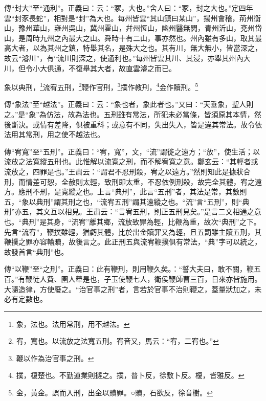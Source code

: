 {\noindent\zhuan{}\fzbyks 傳“封大”至“通利”。正義曰：云：“冢，大也。”舍人曰：“冢，封之大也。”定四年雲“封豕長蛇”，相對是“封”為大也。每州皆雲“其山鎮曰某山”，揚州會稽，荊州衡山，豫州華山，雍州吳山，冀州霍山，幷州恆山，幽州醫無閭，青州沂山，兗州岱山，是周時九州之內最大之山。舜時十有二山，事亦然也。州內雖有多山，取其最高大者，以為其州之鎮，特舉其名，是殊大之也。其有川，無大無小，皆當深之，故云“濬川”，有“流川則深之，使通利也。”每州皆雲其川、其浸，亦舉其州內大川，但令小大俱通，不復舉其大者，故直雲濬之而已。 \par}

象以典刑，\footnote{象，法也。法用常刑，用不越法。}流宥五刑，\footnote{宥，寬也。以流放之法寬五刑。宥音又，馬云：“宥，二宥也。”}鞭作官刑，\footnote{鞭以作為治官事之刑。}撲作教刑，\footnote{撲，榎楚也。不勤道業則撻之。撲，普卜反，徐敷卜反。榎，皆雅反。}金作贖刑。\footnote{金，黃金。誤而入刑，出金以贖罪。○贖，石欲反，徐音樹。}

{\noindent\zhuan{}\fzbyks 傳“象法”至“越法”。正義曰：云：“象也者，象此者也。”又曰：“天垂象，聖人則之。”是“象”為仿法，故為法也。五刑雖有常法，所犯未必當條，皆須原其本情，然後斷決。或情有差降，俱被重科；或意有不同，失出失入，皆是違其常法。故令依法用其常刑，用之使不越法也。 \par}

{\noindent\zhuan{}\fzbyks 傳“宥寬”至“五刑”。正義曰：“宥，寬”，文，“流”謂徙之遠方；“放”，使生活；以流放之法寬縱五刑也。此惟解以流寬之刑，而不解宥寬之意。鄭玄云：“其輕者或流放之，四罪是也。”王肅云：“謂君不忍刑殺，宥之以遠方。”然則知此是據狀合刑，而情差可恕，全赦則太輕，致刑即太重，不忍依例刑殺，故完全其體，宥之遠方。應刑不刑，是寬縱之也。上言“典刑”，此言“五刑”者，其法是常，其數則五，“象以典刑”謂其刑之也，“流宥五刑”謂其遠縱之也。“流”言“五刑”，則“典刑”亦五，其文互以相見。王肅云：“言宥五刑，則正五刑見矣。”是言二文相通之意也。“典刑”是其身，“流宥”離其鄉，流放致罪為輕，比鞭為重，故次“典刑”之下。先言“流宥”，鞭撲雖輕，猶虧其體，比於出金贖罪又為輕，且五罰雖主贖五刑，其鞭撲之罪亦容輸贖，故後言之。此正刑五與流宥鞭撲俱有常法，“典”字可以統之，故發首言“典刑”也。 \par}

{\noindent\zhuan{}\fzbyks 傳“以鞭”至“之刑”。正義曰：此有鞭刑，則用鞭久矣。：“誓大夫曰，敢不關，鞭五百。”有鞭徒人費、圉人犖是也，子玉使鞭七人，衛侯鞭師曹三百，日來亦皆施用。大隨造律，方使廢之。“治官事之刑”者，言若於官事不治則鞭之，蓋量狀加之，未必有定數也。 \par}

